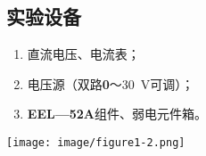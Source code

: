 \documentclass[UTF8]{article}
\begin{document}
        \subsection{实验设备}
            \begin{adjustwidth}{0em}{0em}
                \begin{minipage}[b]{0.45\textwidth}
                    \begin{enumerate}[label=\textbf{\arabic*}.]
                        \item 直流电压、电流表； 
                        \item 电压源（双路\textbf{0}～\SI{30}{V}可调）； 
                        \item \textbf{EEL—52A}组件、弱电元件箱。
                    \end{enumerate}
                \end{minipage}
                \hfill
                \begin{minipage}[H]{0.45\textwidth}
                    \centering
                    \texttt{[image: image/figure1-2.png]}
                \end{minipage}
            \end{adjustwidth}
\end{document}
